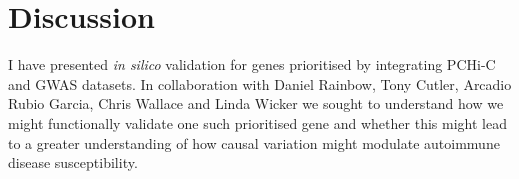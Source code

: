 \documentclass[a4paper,11pt]{report}
\begin{document}

\chapter{Discussion}

I have presented \textit{in silico} validation for genes prioritised by integrating PCHi-C and GWAS datasets. In collaboration with Daniel Rainbow, Tony Cutler, Arcadio Rubio Garcia, Chris Wallace and Linda Wicker we sought to understand how we might functionally validate one such prioritised gene and whether this might lead to a greater understanding of how causal variation might modulate autoimmune disease susceptibility.
\end{document}
